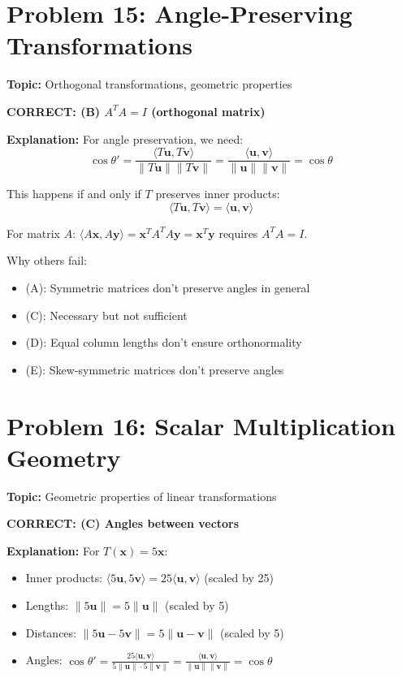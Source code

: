 \documentclass[12pt]{amsart}
\newcommand{\correct}[1]{{\color{blue}\textbf{CORRECT: #1}}}
\begin{document}
\hrulefill

\section*{Problem 15: Angle-Preserving Transformations}
\textbf{Topic:} Orthogonal transformations, geometric properties

\correct{(B) $A^TA = I$ (orthogonal matrix)}

\textbf{Explanation:} 
For angle preservation, we need:
$$\cos\theta' = \frac{\langle T\mathbf{u}, T\mathbf{v}\rangle}{\|T\mathbf{u}\|\|T\mathbf{v}\|} = \frac{\langle \mathbf{u}, \mathbf{v}\rangle}{\|\mathbf{u}\|\|\mathbf{v}\|} = \cos\theta$$

This happens if and only if $T$ preserves inner products:
$$\langle T\mathbf{u}, T\mathbf{v}\rangle = \langle \mathbf{u}, \mathbf{v}\rangle$$

For matrix $A$: $\langle A\mathbf{x}, A\mathbf{y}\rangle = \mathbf{x}^TA^TA\mathbf{y} = \mathbf{x}^T\mathbf{y}$ requires $A^TA = I$.

Why others fail:
\begin{itemize}
\item (A): Symmetric matrices don't preserve angles in general
\item (C): Necessary but not sufficient
\item (D): Equal column lengths don't ensure orthonormality
\item (E): Skew-symmetric matrices don't preserve angles
\end{itemize}

\hrulefill

\section*{Problem 16: Scalar Multiplication Geometry}
\textbf{Topic:} Geometric properties of linear transformations

\correct{(C) Angles between vectors}

\textbf{Explanation:} 
For $T(\mathbf{x}) = 5\mathbf{x}$:

\begin{itemize}
\item Inner products: $\langle 5\mathbf{u}, 5\mathbf{v}\rangle = 25\langle\mathbf{u}, \mathbf{v}\rangle$ (scaled by 25)
\item Lengths: $\|5\mathbf{u}\| = 5\|\mathbf{u}\|$ (scaled by 5)
\item Distances: $\|5\mathbf{u} - 5\mathbf{v}\| = 5\|\mathbf{u} - \mathbf{v}\|$ (scaled by 5)
\item Angles: $\cos\theta' = \frac{25\langle\mathbf{u}, \mathbf{v}\rangle}{5\|\mathbf{u}\| \cdot 5\|\mathbf{v}\|} = \frac{\langle\mathbf{u}, \mathbf{v}\rangle}{\|\mathbf{u}\|\|\mathbf{v}\|} = \cos\theta$  
\end{itemize}
\end{document}
